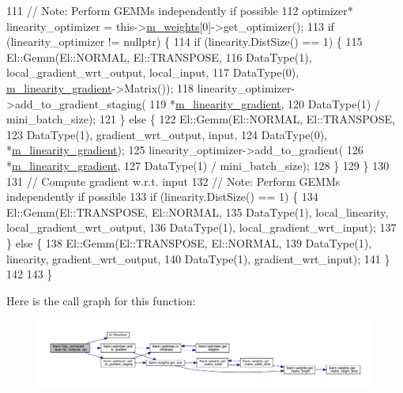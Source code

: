 \begin{DoxyCode}
111   \textcolor{comment}{// Note: Perform GEMMs independently if possible}
112   optimizer* linearity\_optimizer = this->\hyperlink{classlbann_1_1Layer_a7954e30fbf9100a6ba4b56d02767a469}{m\_weights}[0]->get\_optimizer();
113   \textcolor{keywordflow}{if} (linearity\_optimizer != \textcolor{keyword}{nullptr}) \{
114     \textcolor{keywordflow}{if} (linearity.DistSize() == 1) \{
115       El::Gemm(El::NORMAL, El::TRANSPOSE,
116                DataType(1), local\_gradient\_wrt\_output, local\_input,
117                DataType(0), \hyperlink{classlbann_1_1fully__connected__layer_ab80f9cb94662ce4d90aa6d8b5cfa0803}{m\_linearity\_gradient}->Matrix());
118       linearity\_optimizer->add\_to\_gradient\_staging(
119         *\hyperlink{classlbann_1_1fully__connected__layer_ab80f9cb94662ce4d90aa6d8b5cfa0803}{m\_linearity\_gradient},
120         DataType(1) / mini\_batch\_size);
121     \} \textcolor{keywordflow}{else} \{
122       El::Gemm(El::NORMAL, El::TRANSPOSE,
123                DataType(1), gradient\_wrt\_output, input,
124                DataType(0), *\hyperlink{classlbann_1_1fully__connected__layer_ab80f9cb94662ce4d90aa6d8b5cfa0803}{m\_linearity\_gradient});
125       linearity\_optimizer->add\_to\_gradient(
126         *\hyperlink{classlbann_1_1fully__connected__layer_ab80f9cb94662ce4d90aa6d8b5cfa0803}{m\_linearity\_gradient},
127         DataType(1) / mini\_batch\_size);
128     \}
129   \}
130 
131   \textcolor{comment}{// Compute gradient w.r.t. input}
132   \textcolor{comment}{// Note: Perform GEMMs independently if possible}
133   \textcolor{keywordflow}{if} (linearity.DistSize() == 1) \{
134     El::Gemm(El::TRANSPOSE, El::NORMAL,
135              DataType(1), local\_linearity, local\_gradient\_wrt\_output,
136              DataType(1), local\_gradient\_wrt\_input);
137   \} \textcolor{keywordflow}{else} \{
138     El::Gemm(El::TRANSPOSE, El::NORMAL,
139              DataType(1), linearity, gradient\_wrt\_output,
140              DataType(1), gradient\_wrt\_input);
141   \}
142 
143 \}
\end{DoxyCode}
Here is the call graph for this function\+:\nopagebreak
\begin{figure}[H]
\begin{center}
\leavevmode
\includegraphics[width=350pt]{classlbann_1_1fully__connected__layer_a4c5b0eea2036c41b15ec03594dac8dc2_cgraph}
\end{center}
\end{figure}
\mbox{\label{classlbann_1_1fully__connected__layer_af65e177e5f2b1a1d2854a04b433f7dae}} 
